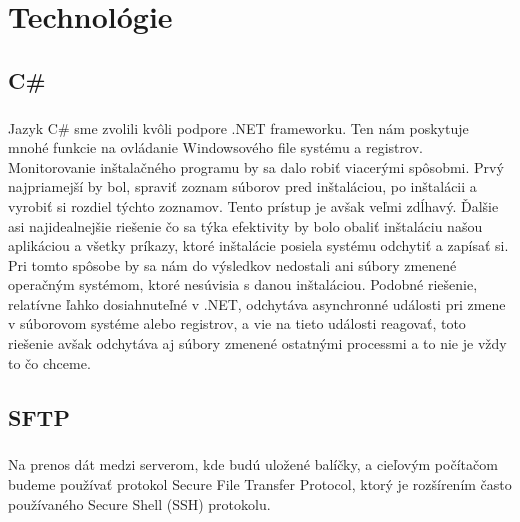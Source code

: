 \chapter{Technológie}

\section{C\#}
\paragraph{}
Jazyk C\# sme zvolili kvôli podpore .NET frameworku. Ten nám poskytuje mnohé funkcie na ovládanie Windowsového file systému a registrov. Monitorovanie inštalačného programu by sa dalo robiť viacerými spôsobmi. Prvý najpriamejší by bol, spraviť zoznam súborov pred inštaláciou, po inštalácii a vyrobiť si rozdiel týchto zoznamov. Tento prístup je avšak veľmi zdĺhavý. Ďalšie asi najidealnejšie riešenie čo sa týka efektivity by bolo obaliť inštaláciu našou aplikáciou a všetky príkazy, ktoré inštalácie posiela systému odchytiť a zapísať si. Pri tomto spôsobe by sa nám do výsledkov nedostali ani súbory zmenené operačným systémom, ktoré nesúvisia s danou inštaláciou. Podobné riešenie, relatívne ľahko dosiahnuteľné v .NET, odchytáva asynchronné události pri zmene v súborovom systéme alebo registrov, a vie na tieto události reagovať, toto riešenie avšak odchytáva aj súbory zmenené ostatnými processmi a to nie je vždy to čo chceme.

\section{SFTP}
\paragraph{}
Na prenos dát medzi serverom, kde budú uložené balíčky, a cieľovým počítačom budeme používať protokol Secure File Transfer Protocol, ktorý je rozšírením často používaného Secure Shell (SSH) protokolu.